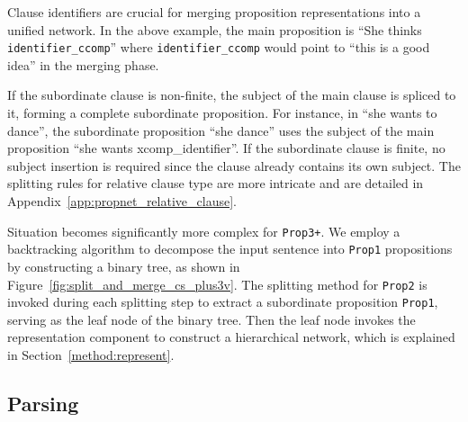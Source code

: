 Clause identifiers are crucial for merging proposition representations into a unified network. In the above example, the main proposition is ``She thinks \texttt{identifier\_ccomp}'' where \texttt{identifier\_ccomp} would point to ``this is a good idea'' in the merging phase.

If the subordinate clause is non-finite, the subject of the main clause is spliced to it, forming a complete subordinate proposition. For instance, in ``she wants to dance'', the subordinate proposition ``she dance'' uses the subject of the main proposition ``she wants xcomp\_identifier''. If the subordinate clause is finite, no subject insertion is required since the clause already contains its own subject. The splitting rules for relative clause type are more intricate and are detailed in Appendix~\ref{app:propnet_relative_clause}.

Situation becomes significantly more complex for \texttt{Prop3+}. We employ a backtracking algorithm to decompose the input sentence into \texttt{Prop1} propositions by constructing a binary tree, as shown in Figure~\ref{fig:split_and_merge_cs_plus3v}. The splitting method for \texttt{Prop2} is invoked during each splitting step to extract a subordinate proposition \texttt{Prop1}, serving as the leaf node of the binary tree. Then the leaf node invokes the representation component to construct a hierarchical network, which is explained in Section~\ref{method:represent}.





\subsection{Parsing}
\label{method:parse}

